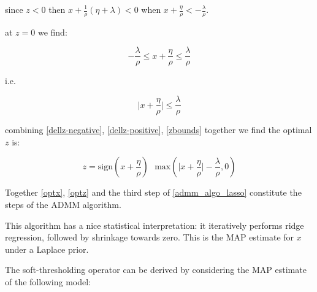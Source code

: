 \begin{example}[LASSO]
since \(z<0\) then \(x + \frac{1}{\rho} ( \eta + \lambda ) < 0\) when \(x + \frac{\eta}{\rho} < - \frac{\lambda}{\rho}\).

at \(z=0\) we find:

\begin{equation*}
-\frac{\lambda}{\rho} \leq x + \frac{\eta}{\rho} \leq \frac{\lambda}{\rho}
\end{equation*}

i.e.

\begin{equation}
\lvert x+ \frac{\eta}{\rho}\rvert \leq \frac{\lambda}{\rho}
\label{zbounds}
\end{equation}

combining \eqref{dellz-negative}, \eqref{dellz-positive}, \eqref{zbounds} together we find the optimal \(z\) is:

\begin{equation}
z = \mathrm{sign}(x+\frac{\eta}{\rho})\text{ }\mathrm{max}\left( \lvert x+\frac{\eta}{\rho} \rvert- \frac{\lambda}{\rho} ,0\right)
\label{optz}
\end{equation}

Together \eqref{optx}, \eqref{optz} and the third step of \eqref{admm_algo_lasso} constitute the steps of the ADMM algorithm.

\end{example}

This algorithm has a nice statistical interpretation: it iteratively performs ridge regression, followed by shrinkage towards zero. This is the MAP estimate for \(x\) under a Laplace prior.

The soft-thresholding operator can be derived by considering the MAP estimate of the following model:

